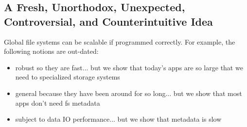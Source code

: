 \subsection*{A Fresh, Unorthodox, Unexpected, Controversial, and Counterintuitive Idea}

Global file systems can be scalable if programmed correctly. For example, the
following notions are out-dated:

\begin{itemize}

  \item robust so they are fast... but we show that today's apps are so large
  that we need to specialized storage systems

  \item general because they have been around for so long... but we show that
  most apps don't need fs metadata

  \item subject to data IO performance... but we show that metadata is slow

\end{itemize}



